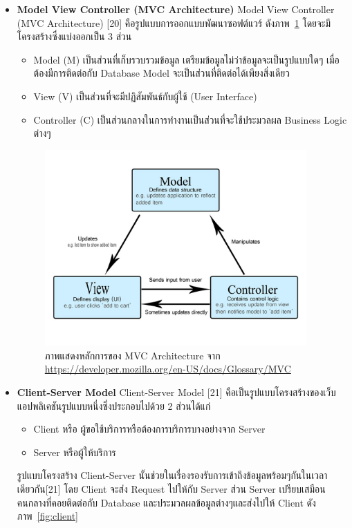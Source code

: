 \documentclass[12pt,oneside,openright,a4paper]{cpe-thai-project}
\begin{document}
\begin{itemize}
\item \textbf {Model View Controller (MVC Architecture)}
Model View Controller (MVC Architecture) [20] คือรูปแบบการออกแบบพัฒนาซอฟต์แวร์ ดังภาพ~\ref{fig:mvc} โดยจะมีโครงสร้างซึ่งแบ่งออกเป็น 3 ส่วน
\begin{itemize}
\item Model (M) เป็นส่วนที่เก็บรวบรวมข้อมูล เตรียมข้อมูลไม่ว่าข้อมูลจะเป็นรูปแบบใดๆ เมื่อต้องมีการติดต่อกับ Database Model จะเป็นส่วนที่ติดต่อได้เพียงสิ่งเดียว
\item View (V) เป็นส่วนที่จะมีปฏิสัมพันธ์กับผู้ใช้ (User Interface)
\item Controller (C) เป็นส่วนกลางในการทำงานเป็นส่วนที่จะใช้ประมวลผล Business Logic ต่างๆ
\end{itemize}

\begin{figure}[!h]\centering
\includegraphics[width=10cm]{image/mvc.jpg} 
\caption{ภาพแสดงหลักการของ MVC Architecture จาก \url{https://developer.mozilla.org/en-US/docs/Glossary/MVC}}
\label{fig:mvc}
\end{figure}

\item \textbf {Client-Server Model }
Client-Server Model [21] คือเป็นรูปแบบโครงสร้างของเว็บแอปพลิเคชันรูปแบบหนึ่งซึ่งประกอบไปด้วย 2 ส่วนได้แก่
\begin{itemize}
\item Client หรือ ผู้ขอใช้บริการหรือต้องการบริการบางอย่างจาก Server
\item Server หรือผู้ให้บริการ
\end{itemize}
รูปแบบโครงสร้าง Client-Server นั้นช่วยในเรื่องรองรับการเข้าถึงข้อมูลพร้อมๆกันในเวลาเดียวกัน[21] โดย Client จะส่ง Request ไปให้กับ Server ส่วน Server เปรียบเสมือนคนกลางที่คอยติดต่อกับ Database และประมวลผลข้อมูลต่างๆและส่งไปให้ Client ดังภาพ~\ref{fig:client}


\end{itemize}
\end{document}
